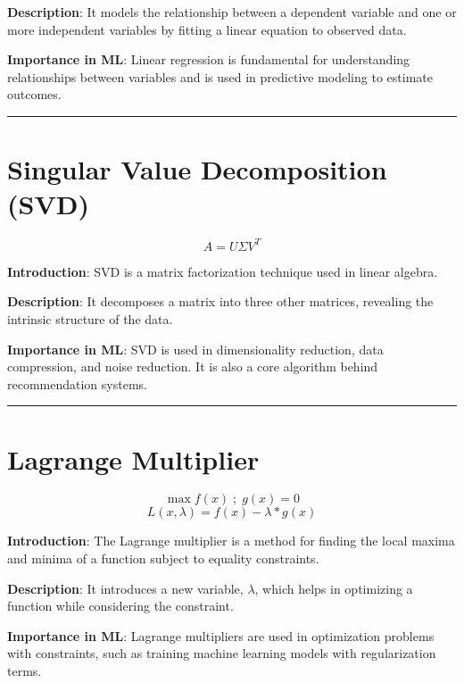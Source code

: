 \documentclass[
  12 pt,
  a4paper,
]{book}
\numberwithin{equation}{section}
\theoremstyle{plain}      %
\theoremstyle{definition} %
\theoremstyle{remark}     %
\theoremstyle{note}         %
\begin{document}
\textbf{Description}: It models the relationship between a dependent
variable and one or more independent variables by fitting a linear
equation to observed data.

\textbf{Importance in ML}: Linear regression is fundamental for
understanding relationships between variables and is used in predictive
modeling to estimate outcomes.

\begin{center}\rule{0.5\linewidth}{0.5pt}\end{center}

\newpage

\hypertarget{singular-value-decomposition-svd}{%
\chapter{Singular Value Decomposition
(SVD)}\label{singular-value-decomposition-svd}}

\[
A = U \Sigma V^T
\]

\textbf{Introduction}: SVD is a matrix factorization technique used in
linear algebra.

\textbf{Description}: It decomposes a matrix into three other matrices,
revealing the intrinsic structure of the data.

\textbf{Importance in ML}: SVD is used in dimensionality reduction, data
compression, and noise reduction. It is also a core algorithm behind
recommendation systems.

\begin{center}\rule{0.5\linewidth}{0.5pt}\end{center}

\newpage

\hypertarget{lagrange-multiplier}{%
\chapter{Lagrange Multiplier}\label{lagrange-multiplier}}

\[
\max f(x) \;; \; g(x) = 0
\] \[
L(x, \lambda) = f(x) - \lambda \ast g(x)
\]

\textbf{Introduction}: The Lagrange multiplier is a method for finding
the local maxima and minima of a function subject to equality
constraints.

\textbf{Description}: It introduces a new variable, \(\lambda\), which
helps in optimizing a function while considering the constraint.

\textbf{Importance in ML}: Lagrange multipliers are used in optimization
problems with constraints, such as training machine learning models with
regularization terms.
\end{document}
